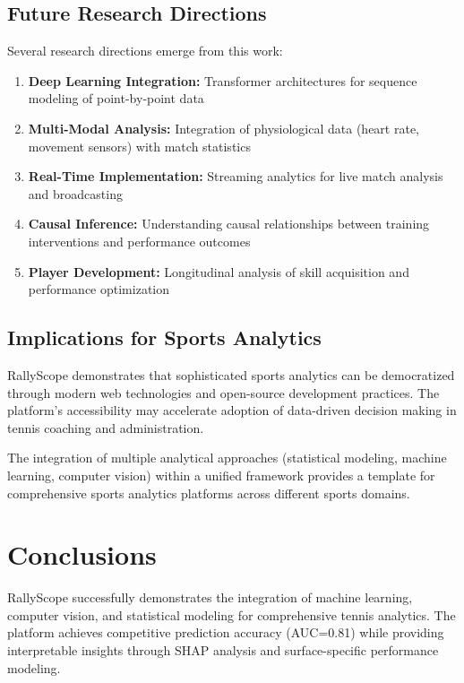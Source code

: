 \documentclass[11pt,a4paper]{article}
\begin{document}
\subsection{Future Research Directions}

Several research directions emerge from this work:

\begin{enumerate}
    \item \textbf{Deep Learning Integration:} Transformer architectures for sequence modeling of point-by-point data
    \item \textbf{Multi-Modal Analysis:} Integration of physiological data (heart rate, movement sensors) with match statistics
    \item \textbf{Real-Time Implementation:} Streaming analytics for live match analysis and broadcasting
    \item \textbf{Causal Inference:} Understanding causal relationships between training interventions and performance outcomes
    \item \textbf{Player Development:} Longitudinal analysis of skill acquisition and performance optimization
\end{enumerate}

\subsection{Implications for Sports Analytics}

RallyScope demonstrates that sophisticated sports analytics can be democratized through modern web technologies and open-source development practices. The platform's accessibility may accelerate adoption of data-driven decision making in tennis coaching and administration.

The integration of multiple analytical approaches (statistical modeling, machine learning, computer vision) within a unified framework provides a template for comprehensive sports analytics platforms across different sports domains.

\section{Conclusions}

RallyScope successfully demonstrates the integration of machine learning, computer vision, and statistical modeling for comprehensive tennis analytics. The platform achieves competitive prediction accuracy (AUC=0.81) while providing interpretable insights through SHAP analysis and surface-specific performance modeling.
\end{document}
